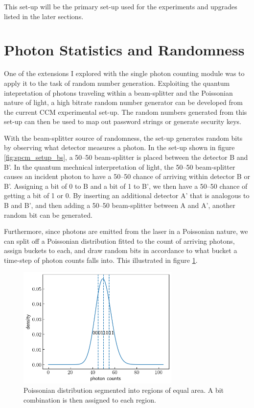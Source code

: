 \documentclass[letterpaper, 11 pt]{book}
\begin{document}
This set-up will be the primary set-up used for the experiments and upgrades
listed in the later sections. 


\section{Photon Statistics and Randomness}

One of the extensions I explored with the single photon counting module was to
apply it to the task of random number generation. Exploiting the quantum
intepretation of photons traveling within a beam-splitter and the Poissonian
nature of light, a high bitrate random number generator can be developed from
the current CCM experimental set-up. The random numbers generated from this
set-up can then be used to map out password strings or generate security keys.

With the beam-splitter source of randomness, the set-up generates random bits by
observing what detector measures a photon. In the set-up shown in figure
\ref{fig:spcm_setup_bs}, a 50--50 beam-splitter is placed between the detector B
and B'. In the quantum mechnical interpretation of light, the 50--50
beam-splitter causes an incident photon to have a 50--50 chance of arriving
within detector B or B'. Assigning a bit of 0 to B and a bit of 1 to B', we then
have a 50--50 chance of getting a bit of 1 or 0. By inserting an additional
detector A' that is analogous to B and B', and then adding a 50--50
beam-splitter between A and A', another random bit can be generated. 

Furthermore, since photons are emitted from the laser in a Poissonian nature, we
can split off a Poissonian distribution fitted to the count of arriving photons,
assign buckets to each, and draw random bits in accordance to what bucket a
time-step of photon counts falls into. This illustrated in figure
\ref{fig:poisson}.
\begin{figure}[H]
    \centering
    \includegraphics[width = 8cm]{poisson_cut.png}
    \caption{Poissonian distribution segmented into regions of equal area. A bit combination is then assigned to each region.}
    \label{fig:poisson}
\end{figure}
\end{document}
